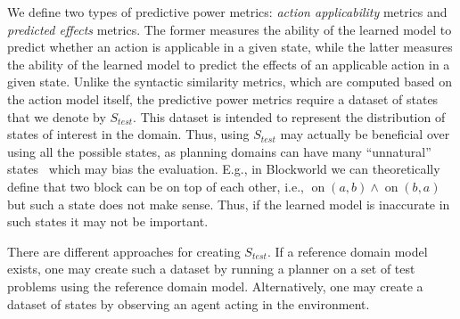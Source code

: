 \documentclass{article}
\theoremstyle{definition}
\theoremstyle{remark}
\newcommand{\stest}{\ensuremath{S_{\textit{test}}}\xspace}
\newif\ifaddcomments
\newcommand{\roni}[1]{\ifaddcomments{\textcolor{red}{[Roni: #1]}}\fi}
\newcommand{\gregor}[1]{\ifaddcomments{\textcolor{orange}{[Gregor: #1]}}\fi}
\newcommand{\cm}[1]{\ifaddcomments{\textcolor{olive}{[Christian: #1]}}\fi}
\begin{document}
\cm{Up until this point, I thought it was headed towards the predictive power of explaining the trajectory data. Given that it's about action applicability, this needs to be clarified much earlier on (e.g., intro). Also means that we don't have a notion of how well the learned model predicts the trajectories?}
\roni{Hmm. I assumed all models are consistent with the given trajectories, so to evaluate it we must have other states and the ability to evaluate with the environment. TODO: clarify this.}
\cm{I think just stating that assumption, and maybe moving the citations in the above text to the end of the sentence, would do.}
\roni{I'm not sure. One could conceivably choose an algorithm that is not consistent. I need to think about this more.}


We define two types of predictive power metrics: \emph{action applicability} metrics and \emph{predicted effects} metrics. 
The former measures the ability of the learned model to predict whether an action is applicable in a given state, while the latter measures the ability of the learned model to predict the effects of an applicable action in a given state.
Unlike the syntactic similarity metrics, which are computed based on the action model itself, the predictive power metrics require a dataset of states that we denote by $\stest$. 
This dataset is intended to represent the distribution of states of interest in the domain. 
Thus, using \stest may actually be beneficial over using all the possible states, as planning domains can have many ``unnatural'' states~\cite{grundke2024frepr} which may bias the evaluation. 
E.g., in Blockworld we can theoretically define that two block can be on top of each other, i.e., $\operatorname{on}(a, b) \wedge \operatorname{on}(b, a)$ but such a state does not make sense. Thus, if the learned model is inaccurate in such states it may not be important. 

There are different approaches for creating $\stest$. If a reference domain model exists, one may create such a dataset by running a planner on a set of test problems using the reference domain model. Alternatively, one may create a dataset of states by observing an agent acting in the environment. 



\end{document}

